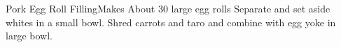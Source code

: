 \documentclass[]{article}
\title{}
\author{}
\begin{document}
\begin{recipe}{Pork Egg Roll Filling}{}{Makes About 30 large egg rolls}
	Separate and set aside whites in a small bowl. 
	Shred carrots and taro and combine with egg yoke in large bowl. 
\end{recipe}
\end{document}
